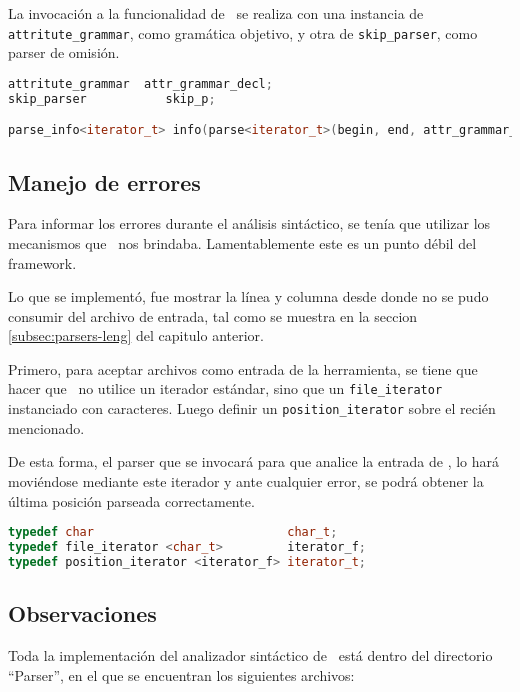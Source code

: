 La invocación a la funcionalidad de \spirit\ se realiza con una instancia de \texttt{attritute\_grammar}, como gramática objetivo, y otra de \texttt{skip\_parser}, como parser de omisión.

\begin{lstlisting}[language=C++, basicstyle=\scriptsize, columns=fullflexible, linewidth=13cm]
attritute_grammar  attr_grammar_decl;
skip_parser           skip_p;

parse_info<iterator_t> info(parse<iterator_t>(begin, end, attr_grammar_decl, skip_p));
\end{lstlisting}

\subsection{Manejo de errores}

Para informar los errores durante el análisis sintáctico, se tenía que utilizar los mecanismos que \spirit\ nos brindaba. Lamentablemente este es un punto débil del framework.

Lo que se implementó, fue mostrar la línea y columna desde donde no se pudo consumir del archivo de entrada, tal como se muestra en la seccion \ref{subsec:parsers-leng} del capitulo anterior.

Primero, para aceptar archivos como entrada de la herramienta, se tiene que hacer que \spirit\ no utilice un iterador estándar, sino que un \texttt{file\_iterator} instanciado con caracteres. Luego definir un \texttt{position\_iterator} sobre el recién mencionado.

De esta forma, el parser que se invocará para que analice la entrada de \maggen, lo hará moviéndose mediante este iterador y ante cualquier error, se podrá obtener la última posición parseada correctamente.

\begin{lstlisting}[language=C++, basicstyle=\scriptsize, linewidth=10cm]
typedef char                           char_t;
typedef file_iterator <char_t>         iterator_f;
typedef position_iterator <iterator_f> iterator_t;
\end{lstlisting}

\subsection{Observaciones}

Toda la implementación del analizador sintáctico de \maggen\ está dentro del directorio ``Parser'', en el que se encuentran los siguientes archivos:

